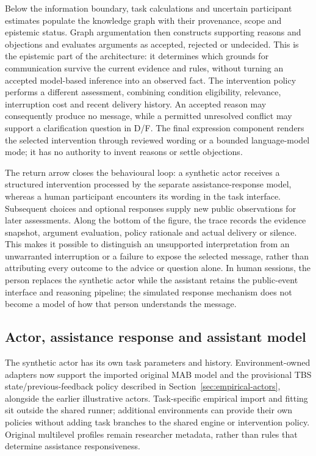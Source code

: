 \documentclass[11pt,a4paper]{article}
\begin{document}
Below the information boundary, task calculations and uncertain participant estimates populate the knowledge graph with their provenance, scope and epistemic status. Graph argumentation then constructs supporting reasons and objections and evaluates arguments as accepted, rejected or undecided. This is the epistemic part of the architecture: it determines which grounds for communication survive the current evidence and rules, without turning an accepted model-based inference into an observed fact. The intervention policy performs a different assessment, combining condition eligibility, relevance, interruption cost and recent delivery history. An accepted reason may consequently produce no message, while a permitted unresolved conflict may support a clarification question in D/F. The final expression component renders the selected intervention through reviewed wording or a bounded language-model mode; it has no authority to invent reasons or settle objections.

The return arrow closes the behavioural loop: a synthetic actor receives a structured intervention processed by the separate assistance-response model, whereas a human participant encounters its wording in the task interface. Subsequent choices and optional responses supply new public observations for later assessments. Along the bottom of the figure, the trace records the evidence snapshot, argument evaluation, policy rationale and actual delivery or silence. This makes it possible to distinguish an unsupported interpretation from an unwarranted interruption or a failure to expose the selected message, rather than attributing every outcome to the advice or question alone. In human sessions, the person replaces the synthetic actor while the assistant retains the public-event interface and reasoning pipeline; the simulated response mechanism does not become a model of how that person understands the message.

\subsection{Actor, assistance response and assistant model}
The synthetic actor has its own task parameters and history. Environment-owned adapters now support the imported original MAB model and the provisional TBS state/previous-feedback policy described in Section~\ref{sec:empirical-actors}, alongside the earlier illustrative actors. Task-specific empirical import and fitting sit outside the shared runner; additional environments can provide their own policies without adding task branches to the shared engine or intervention policy. Original multilevel profiles remain researcher metadata, rather than rules that determine assistance responsiveness.
\end{document}
